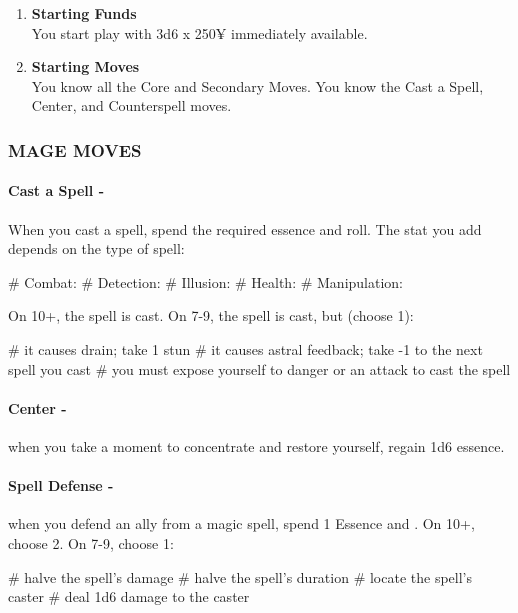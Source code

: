\begin{enumerate}
    \item \textbf{Starting Funds} \\
    You start play with 3d6 x 250¥ immediately available.
    
    \item \textbf{Starting Moves} \\
    You know all the Core and Secondary Moves. You know the Cast a Spell, Center, and Counterspell moves.
\end{enumerate}

\subsubsection{MAGE MOVES}
\paragraph{Cast a Spell -} When you cast a spell, spend the required essence and roll. The stat you add depends on the type of spell:
    \begin{easylist}
        # Combat: 
        # Detection: 
        # Illusion: 
        # Health: 
        # Manipulation: 
    \end{easylist}        
On 10+, the spell is cast. On 7-9, the spell is cast, but (choose 1):
    \begin{easylist}
        # it causes drain; take 1 stun
        # it causes astral feedback; take -1 to the next spell you cast
        # you must expose yourself to danger or an attack to cast the spell
    \end{easylist}

\paragraph{Center -} when you take a moment to concentrate and restore yourself, regain 1d6 essence.

\paragraph{Spell Defense -} when you defend an ally from a magic spell, spend 1 Essence and . On 10+, choose 2. On 7-9, choose 1:
    \begin{easylist}
        # halve the spell’s damage
        # halve the spell’s duration
        # locate the spell’s caster
        # deal 1d6 damage to the caster
    \end{easylist}

